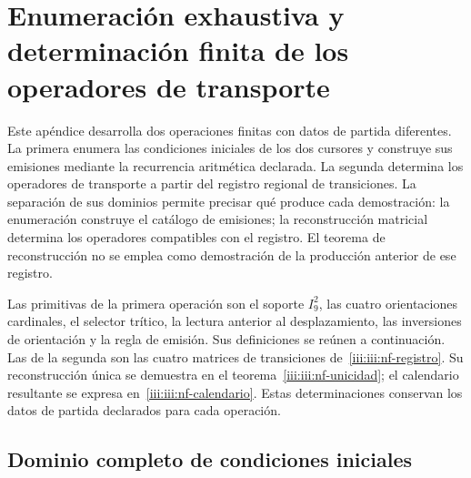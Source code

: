 \section{Enumeración exhaustiva y determinación finita de los operadores de transporte}
\label{iii:iii:nucleo-finito}

Este apéndice desarrolla dos operaciones finitas con datos de partida
diferentes. La primera enumera las condiciones iniciales de los dos cursores
y construye sus emisiones mediante la recurrencia aritmética declarada.
La segunda determina los operadores de transporte a partir del registro
regional de transiciones. La separación de sus dominios permite precisar
qué produce cada demostración: la enumeración construye el catálogo de
emisiones; la reconstrucción matricial determina los operadores compatibles
con el registro. El teorema de reconstrucción no se emplea como demostración
de la producción anterior de ese registro.

Las primitivas de la primera operación son el soporte $I_9^2$, las cuatro
orientaciones cardinales, el selector trítico, la lectura anterior al
desplazamiento, las inversiones de orientación y la regla de emisión.
Sus definiciones se reúnen a continuación. Las de la segunda son las
cuatro matrices de transiciones de~\eqref{iii:iii:nf-registro}.
Su reconstrucción única se demuestra en el
teorema~\ref{iii:iii:nf-unicidad}; el calendario resultante se expresa
en~\eqref{iii:iii:nf-calendario}. Estas determinaciones conservan
los datos de partida declarados para cada operación.

\subsection{Dominio completo de condiciones iniciales}

